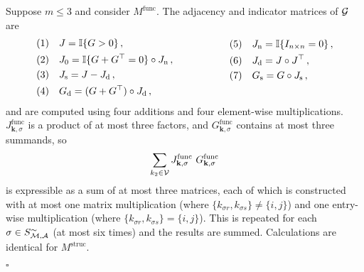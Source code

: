 










\pagebreak

\begin{prf} \label{proof:motif_adj_matrix_computation}
Suppose ${m \leq 3}$ and consider $M^\mathrm{func}$. The adjacency and indicator matrices of $\mathcal{G}$ are
%
\begin{equation*}
	\begin{aligned}[c]
		&(1) \quad J = \mathbb{I} \{ G>0 \}\,, \\
		&(2) \quad J_0 = \mathbb{I} \{ G + G^\top = 0 \} \circ J_\mathrm{n}\,, \\
		&(3) \quad J_\mathrm{s} = J - J_\mathrm{d}\,, \\
		&(4) \quad G_\mathrm{d} = (G + G^\top) \circ J_\mathrm{d} \,,
	\end{aligned}
	\hspace*{2cm}
	\begin{aligned}[c]
		&(5) \quad J_\mathrm{n} = \mathbb{I} \{I_{n \times n} = 0 \}\,, \\
		&(6) \quad J_\mathrm{d} = J \circ J^\top\,, \\
		&(7) \quad G_\mathrm{s} = G \circ J_\mathrm{s}\,, \\
		&
	\end{aligned}
\end{equation*}
%
and are computed using four additions and four element-wise multiplications. $J^\mathrm{func}_{\mathbf{k},\sigma}$ is a product of at most three factors, and $G^\mathrm{func}_{\mathbf{k},\sigma}$ contains at most three summands, so
%
$$ \sum_{k_2 \in \ca{V}} J^\mathrm{func}_{\mathbf{k},\sigma} \ G^\mathrm{func}_{\mathbf{k},\sigma} $$
%
is expressible as a sum of at most three matrices, each of which is constructed with at most one matrix multiplication (where $\{k_{\sigma r},k_{\sigma s}\} \neq \{i,j\}$) and one entry-wise multiplication (where $\{k_{\sigma r},k_{\sigma s}\} = \{i,j\}$). This is repeated for each $\sigma \in S_{\mathcal{M,A}}^\sim$ (at most six times) and the results are summed. Calculations are identical for  $M^\mathrm{struc}$.

\hfill $\square$
\end{prf}










